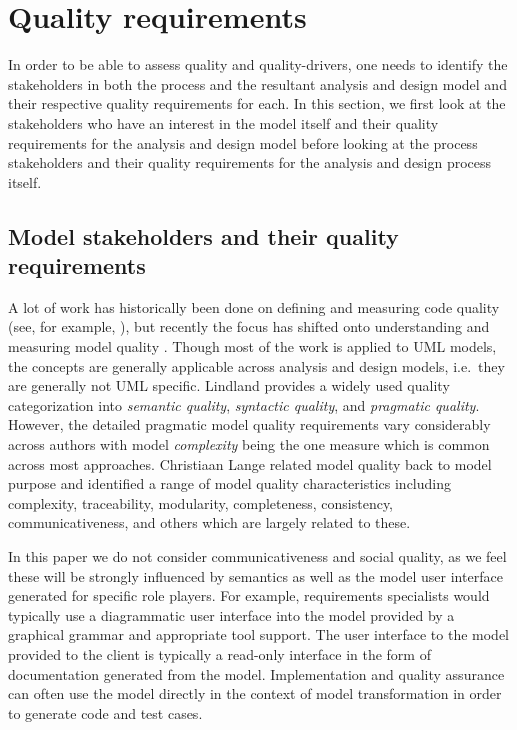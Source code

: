 \section{Quality requirements}
\label{sec:qualityRequirements}

In order to be able to assess quality and quality-drivers, one needs to identify the stakeholders in both the process and the resultant analysis and design model and their respective quality requirements for each. In this section, we first look at the stakeholders who have an interest in the model itself and their quality requirements for the analysis and design model before looking at the process stakeholders and their quality requirements for the analysis and design process itself.


\subsection{Model stakeholders and their quality requirements}
\label{sec:modelStakeholdersAndQualityRequirements}

A lot of work has historically been done on defining and measuring code quality (see, for example, \cite{boehm_barry_w._characteristics_1978}), but recently the focus has shifted onto understanding and measuring model quality \cite{lange_managing_2005,lange_improving_2006,shim_design_2008,qi_yu-dong_analysis_2010}. Though most of the work is applied to UML models, the concepts are generally applicable across analysis and design models, i.e.\ they are generally not UML specific. Lindland \cite{lindland_understanding_1994} provides a widely used quality categorization into \emph{semantic quality}, \emph{syntactic quality}, and \emph{pragmatic quality}. However, the detailed pragmatic model quality requirements vary considerably across authors with model \emph{complexity} being the one measure which is common across most approaches. Christiaan Lange  \cite{lange_christiaan_assessing_2007} related model quality back to model purpose and identified a range of model quality characteristics including complexity, traceability, modularity, completeness, consistency, communicativeness, and others which are largely related to these.

In this paper we do not consider communicativeness and social quality, as we feel these will be strongly influenced by semantics as well as the model user interface generated for specific role players. For example, requirements specialists would typically use a diagrammatic user interface into the model provided by a graphical grammar and appropriate tool support. The user interface to the model provided to the client is typically a read-only interface in the form of documentation generated from the model. Implementation and quality assurance can often use the model directly in the context of model transformation in order to generate code and test cases.

